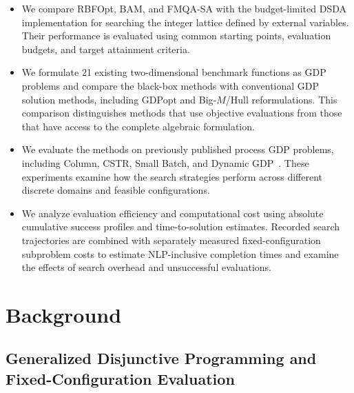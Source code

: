 \documentclass{article}
\begin{document}
\begin{itemize}
    \item We compare RBFOpt, BAM, and FMQA-SA with the budget-limited DSDA implementation for searching the integer lattice defined by external variables. Their performance is evaluated using common starting points, evaluation budgets, and target attainment criteria.

    \item We formulate 21 existing two-dimensional benchmark functions as GDP problems and compare the black-box methods with conventional GDP solution methods, including GDPopt and Big-$M$/Hull reformulations. This comparison distinguishes methods that use objective evaluations from those that have access to the complete algebraic formulation.

    \item We evaluate the methods on previously published process GDP problems, including Column, CSTR, Small Batch, and Dynamic GDP~\cite{ovalle2025logic,peng2024dynamic}. These experiments examine how the search strategies perform across different discrete domains and feasible configurations.

    \item We analyze evaluation efficiency and computational cost using absolute cumulative success profiles and time-to-solution estimates. Recorded search trajectories are combined with separately measured fixed-configuration subproblem costs to estimate NLP-inclusive completion times and examine the effects of search overhead and unsuccessful evaluations.
\end{itemize}

\section{Background}

\subsection{Generalized Disjunctive Programming and Fixed-Configuration Evaluation}
\end{document}
